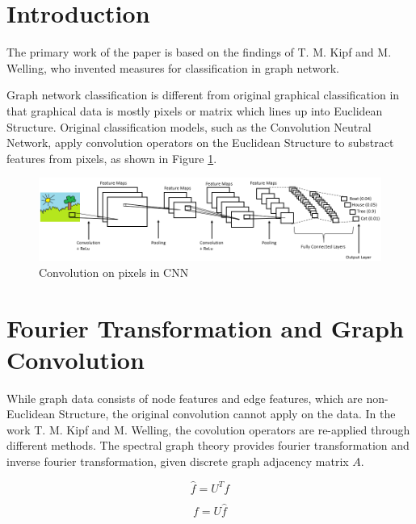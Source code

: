 
\section{Introduction}

The primary work of the paper is based on the findings of T. M. Kipf and M. Welling, 
who invented measures for classification in graph network. 

Graph network classification is different from original graphical classification in that graphical data is mostly pixels or matrix which lines up into Euclidean Structure. Original classification models, such as the Convolution Neutral Network, apply convolution operators on the Euclidean Structure to substract features from pixels, as shown in Figure \ref{cnn-illustration}.

\begin{figure}[H]
    \centering
    \includegraphics[width=.8\textwidth]{figures/cnn-illustration.png}
    \caption{Convolution on pixels in CNN}
    \label{cnn-illustration}
\end{figure}

\section{Fourier Transformation and Graph Convolution}

While graph data consists of node features and edge features, which are non-Euclidean Structure, the original convolution cannot apply on the data. In the work T. M. Kipf and M. Welling, the covolution operators are re-applied through different methods. The spectral graph theory provides fourier transformation and inverse fourier transformation, given discrete graph adjacency matrix $A$.

\begin{equation}
    \hat{f} = U^T f
    \label{discrete-fourier-transformation}
\end{equation}
    
\begin{equation}
    f = U \hat{f}
    \label{discrete-inverse-fourier-transformation}
\end{equation}

